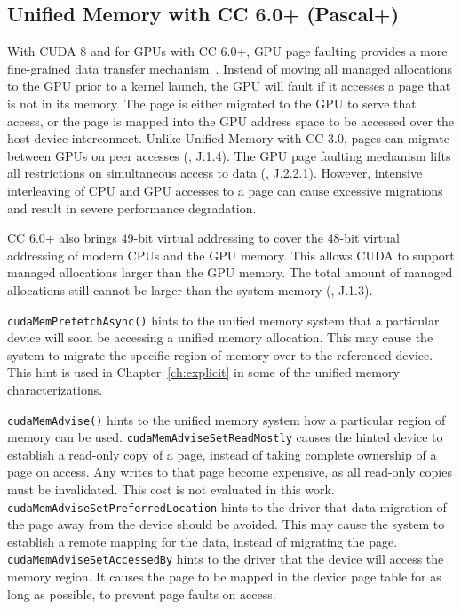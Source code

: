 \subsection{Unified Memory with CC 6.0+ (Pascal+)}
\label{sec:unified-cc6}

With CUDA 8 and for GPUs with CC 6.0+, GPU page faulting provides a more fine-grained data transfer mechanism~\cite{nvidia2017cuda80}.
Instead of moving all managed allocations to the GPU prior to a kernel launch, the GPU will fault if it accesses a page that is not in its memory.
The page is either migrated to the GPU to serve that access, or the page is mapped into the GPU address space to be accessed over the host-device interconnect.
Unlike Unified Memory with CC 3.0, pages can migrate between GPUs on peer accesses (\cite{nvidia2017cuda80}, J.1.4).
The GPU page faulting mechanism lifts all restrictions on simultaneous access to data (\cite{nvidia2017cuda80}, J.2.2.1).
However, intensive interleaving of CPU and GPU accesses to a page can cause excessive migrations and result in severe performance degradation.

CC 6.0+ also brings 49-bit virtual addressing to cover the 48-bit virtual addressing of modern CPUs and the GPU memory.
This allows CUDA to support managed allocations larger than the GPU memory.
The total amount of managed allocations still cannot be larger than the system memory (\cite{nvidia2017cuda80}, J.1.3).

\texttt{cudaMemPrefetchAsync()} hints to the unified memory system that a particular device will soon be accessing a unified memory allocation.
This may cause the system to migrate the specific region of memory over to the referenced device.
This hint is used in Chapter~\ref{ch:explicit} in some of the unified memory characterizations.

\texttt{cudaMemAdvise()} hints to the unified memory system how a particular region of memory can be used.
\texttt{cudaMemAdviseSetReadMostly} causes the hinted device to establish a read-only copy of a page, instead of taking complete ownership of a page on access.
Any writes to that page become expensive, as all read-only copies must be invalidated.
This cost is not evaluated in this work.
\texttt{cudaMemAdviseSetPreferredLocation} hints to the driver that data migration of the page away from the device should be avoided.
This may cause the system to establish a remote mapping for the data, instead of migrating the page.
\texttt{cudaMemAdviseSetAccessedBy} hints to the driver that the device will access the memory region.
It causes the page to be mapped in the device page table for as long as possible, to prevent page faults on access.

